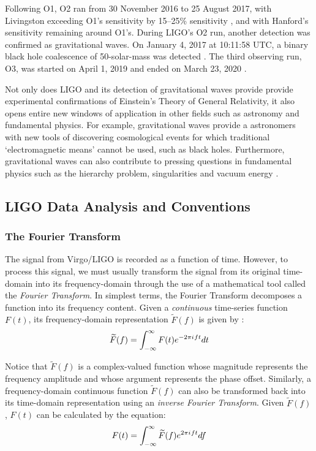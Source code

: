 \documentclass[preprint,
letterpaper,
 amsmath,amssymb,
 aps,
]{revtex4-2}
\newcommand{\iu}{{i\mkern1mu}}
\begin{document}
Following O1, O2 ran from 30 November 2016 to 25 August 2017, with Livingston exceeding O1's sensitivity by 15–25\% sensitivity \cite{collaboration2019open}, and with Hanford's sensitivity remaining around O1's. During LIGO's O2 run, another detection was confirmed as gravitational waves. On January 4, 2017 at 10:11:58 UTC, a binary black hole coalescence of 50-solar-mass was detected \cite{GW170104}. The third observing run, O3, was started on April 1, 2019 and ended on March 23, 2020 \cite{clavin_abazorius_conti_2019}.

Not only does LIGO and its detection of gravitational waves provide provide experimental confirmations of Einstein's Theory of General Relativity, it also opens entire new windows of application in other fields such as astronomy and fundamental physics. For example, gravitational waves provide a astronomers with new tools of discovering cosmological events for which traditional `electromagnetic means' cannot be used, such as black holes.    \cite{JSTORDetecting} Furthermore, gravitational waves can also contribute to pressing questions in fundamental physics such as the hierarchy problem, singularities and vacuum energy \cite{Barack_2019}.

\subsection{LIGO Data Analysis and Conventions} \label{data anal}
\subsubsection{The Fourier Transform}
The signal from Virgo/LIGO is recorded as a function of time. However, to process this signal, we must usually transform the signal from its original time-domain into its frequency-domain through the use of a mathematical tool called the \textit{Fourier Transform}. In simplest terms, the Fourier Transform decomposes a function into its frequency content. Given a \textit{continuous} time-series function $F(t)$, its frequency-domain representation $\widetilde{F}(f)$ is given by \cite{dsptextbook}:
\begin{equation}
\widetilde{F}(f) = \int_{-\infty}^{\infty}F(t)e^{-2\pi\iu ft} dt
\end{equation}

Notice that $\widetilde{F}(f)$ is a complex-valued function whose magnitude represents the frequency amplitude and whose argument represents the phase offset. Similarly, a frequency-domain continuous function $\widetilde{F}(f)$ can also be transformed back into its time-domain representation using an \textit{inverse Fourier Transform}. Given $\widetilde{F}(f)$, $F(t)$ can be calculated by the equation:
\begin{equation}
F(t) = \int_{-\infty}^{\infty}\widetilde{F}(f)e^{2\pi\iu ft} df
\end{equation}
\end{document}
